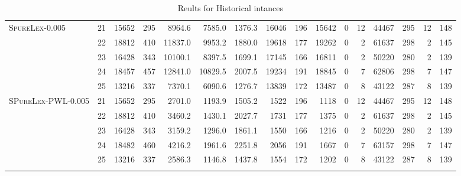 \documentclass{article}
\begin{document}
\begin{table}[htb]
\begin{tabular}{l|c|rr|rrr|rrrrrr|rrr}
\hline
\textsc{SpureLex}-0.005 & 21 & 15652 & 295 & 8964.6 & 7585.0 & 1376.3 &  16046 & 196 & 15642 & 0 & 12 & 44467 & 295 & 12 & 148 \\
                        & 22 & 18812 & 410 & 11837.0 & 9953.2 & 1880.0 &  19618 & 177 & 19262 & 0 & 2 & 61637 & 298 & 2 & 145 \\
                        & 23 & 16428 & 343 & 10100.1 & 8397.5 & 1699.1 &  17145 & 166 & 16811 & 0 & 2 & 50220 & 280 & 2 & 139 \\
                        & 24 & 18457 & 457 & 12841.0 & 10829.5 & 2007.5 &  19234 & 191 & 18845 & 0 & 7 & 62806 & 298 & 7 & 147 \\
                        & 25 & 13216 & 337 & 7370.1 & 6090.6 & 1276.7 &  13839 & 172 & 13487 & 0 & 8 & 43122 & 287 & 8 & 139 \\
\hline

\textsc{SPureLex-PWL}-0.005  & 21 & 15652 & 295 & 2701.0 & 1193.9 & 1505.2 &  1522 & 196 & 1118 & 0 & 12 & 44467 & 295 & 12 & 148 \\
                              & 22 & 18812 & 410 & 3460.2 & 1430.1 & 2027.7 &  1731 & 177 & 1375 & 0 & 2 & 61637 & 298 & 2 & 145 \\
                              & 23 & 16428 & 343 & 3159.2 & 1296.0 & 1861.1 &  1550 & 166 & 1216 & 0 & 2 & 50220 & 280 & 2 & 139 \\
                              & 24 & 18482 & 460 & 4216.2 & 1961.6 & 2251.8 &  2056 & 191 & 1667 & 0 & 7 & 63157 & 298 & 7 & 147 \\
                              & 25 & 13216 & 337 & 2586.3 & 1146.8 & 1437.8 &  1554 & 172 & 1202 & 0 & 8 & 43122 & 287 & 8 & 139 \\
\hline

		\noalign{\smallskip}
        \lasthline
        
	\end{tabular}
	
	\caption{Reults for Historical intances}
\end{table}
\end{document}
